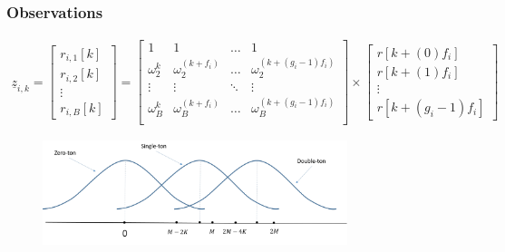 \documentclass[10pt,xcolor=table]{beamer}
\newcommand{\zv}{\underline{z}}
\begin{document}
\begin{frame}\frametitle{Observations}
\begin{align} \nonumber
	    		\zv_{i,k} = \begin{bmatrix}
	    		r_{i,1}[k]\\
	    		r_{i,2}[k]\\
	    		\vdots\\
	    		r_{i,B}[k]
	    		\end{bmatrix}			
            = \begin{bmatrix}
			1 & 1 & \ldots & 1 \\
			\omega^{k}_{2} & \omega^{(k+f_i)}_{2} & \ldots & \omega^{(k+(g_i-1)f_i)}_{2}   \\
			\vdots & \vdots & \ddots & \vdots\\
			\omega^{k}_{B} & \omega^{(k+f_i)}_{B} & \ldots & \omega^{(k+(g_i-1)f_i)}_{B} \\
			\end{bmatrix} \times
			\begin{bmatrix}
			r[k+(0)f_i] \\
			r[k+(1)f_i] \\
			\vdots\\
			r[k+(g_i-1)f_i]
			\end{bmatrix}
			\end{align}

			\begin{figure}[t]
			\begin{center}
				\includegraphics[width=3.5in]{bin_statistics.pdf}
			\end{center}
		\end{figure}

\end{frame}
\end{document}
